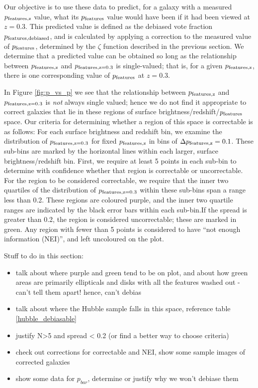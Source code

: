 \documentclass[usenatbib]{mn2e}
\begin{document}
Our objective is to use these data to predict, for a galaxy with a measured $p_{\rm features,z}$ value, what its $p_{\rm features}$ value would have been if it had been viewed at $z=0.3$. This predicted value is defined as the debiased vote fraction $p_{\rm features,debiased}$, and is calculated by applying a correction to the measured value of $p_{\rm features}$, determined by the $\zeta$ function described in the previous section. We determine that a predicted value can be obtained so long as the relationship between $p_{\rm features,z}$ and $p_{\rm features,z=0.3}$ is single-valued; that is, for a given $p_{\rm features,z}$, there is one corresponding value of $p_{\rm features}$ at $z=0.3$. 

In Figure \ref{fig:p_vs_p} we see that the relationship between $p_{\rm features,z}$ and $p_{\rm features,z=0.3}$ is \emph{not} always single valued; hence we do not find it appropriate to correct galaxies that lie in these regions of surface brightness/redshift/$p_{\rm features}$ space. Our criteria for determining whether a region of this space is correctable is as follows: For each surface brightness and redshift bin, we examine the distribution of $p_{\rm features,z=0.3}$ for fixed $p_{\rm features,z}$ in bins of $\Delta p_{\rm features,z} = 0.1$. These sub-bins are marked by the horizontal lines within each larger, surface brightness/redshift bin. First, we require at least 5 points in each sub-bin to determine with confidence whether that region is correctable or uncorrectable. For the region to be considered correctable, we require that the inner two quartiles of the distribution of $p_{\rm features,z=0.3}$ within these sub-bins span a range less than 0.2. These regions are coloured purple, and the inner two quartile ranges are indicated by the black error bars within each sub-bin.If the spread is greater than 0.2, the region is considered uncorrectable; these are marked in green. Any region with fewer than 5 points is considered to have ``not enough information (NEI)'', and left uncoloured on the plot. 

Stuff to do in this section: 

\begin{itemize}
\item talk about where purple and green tend to be on plot, and about how green areas are primarily ellipticals and disks with all the features washed out - can't tell them apart! hence, can't debias
\item talk about where the Hubble sample falls in this space, reference table \ref{hubble_debiasable} 
\item justify N>5 and spread < 0.2 (or find a better way to choose criteria)
\item check out corrections for correctable and NEI, show some sample images of corrected galaxies
\item show some data for $p_{bar}$, determine or justify why we won't debiase them  
\end{itemize}
 
\end{document}
